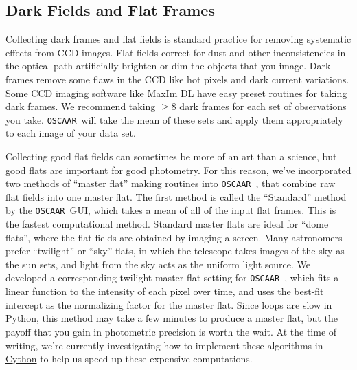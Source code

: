 \documentclass[a4paper]{article}
\newcommand{\code}[1]{\texttt{#1}}
\newcommand{\oscaar}{\code{OSCAAR}~}
\begin{document}
\subsection{Dark Fields and Flat Frames}

Collecting dark frames and flat fields is standard practice for removing systematic effects from CCD images. Flat fields correct for dust and other inconsistencies in the optical path artificially brighten or dim the objects that you image. Dark frames remove some flaws in the CCD like hot pixels and dark current variations. Some CCD imaging software like MaxIm DL have easy preset routines for taking dark frames.  We recommend taking $\ge8$ dark frames for each set of observations you take. \oscaar will take the mean of these sets and apply them appropriately to each image of your data set. 

Collecting good flat fields can sometimes be more of an art than a science, but good flats are important for good photometry. For this reason, we've incorporated two methods of ``master flat'' making routines into \oscaar, that combine raw flat fields into one master flat. The first method is called the ``Standard'' method by the \oscaar GUI, which takes a mean of all of the input flat frames. This is the fastest computational method. Standard master flats are ideal for ``dome flats'', where the flat fields are obtained by imaging a screen. Many astronomers prefer ``twilight'' or ``sky'' flats, in which the telescope takes images of the sky as the sun sets, and light from the sky acts as the uniform light source. We developed a corresponding twilight master flat setting for \oscaar, which fits a linear function to the intensity of each pixel over time, and uses the best-fit intercept as the normalizing factor for the master flat. Since loops are slow in Python, this method may take a few minutes to produce a master flat, but the payoff that you gain in photometric precision is worth the wait. At the time of writing, we're currently investigating how to implement these algorithms in \href{http://www.cython.org/}{Cython} to help us speed up these expensive computations.

\end{document}
